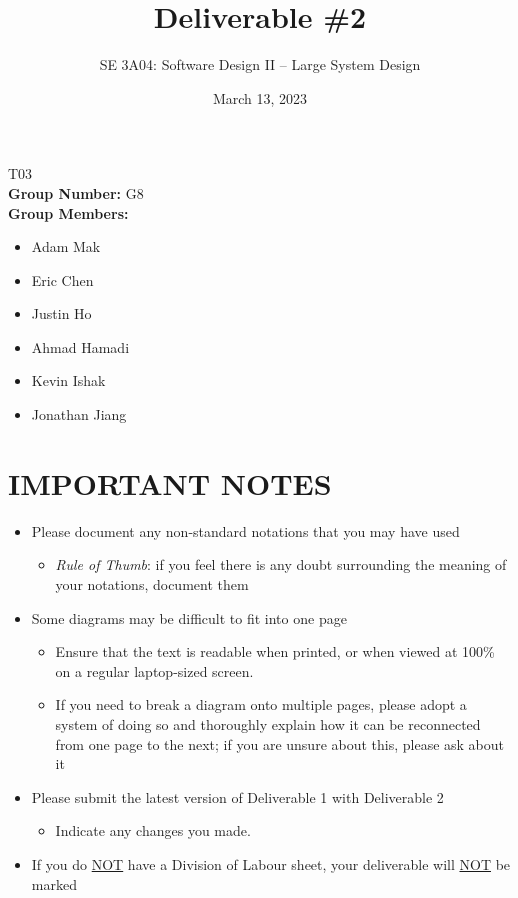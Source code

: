 \documentclass[]{article}
\title{Deliverable \#2}
\author{SE 3A04: Software Design II -- Large System Design}
\date{March 13, 2023}
\begin{document}
\maketitle\begin{center}
 T03\\
{\bf Group Number:} G8 \\
{\bf Group Members:} 
\begin{itemize} \centering
	\item Adam Mak
	\item Eric Chen
	\item Justin Ho
	\item Ahmad Hamadi
	\item Kevin Ishak
	\item Jonathan Jiang
\end{itemize}\end{center}

\section*{IMPORTANT NOTES}
\begin{itemize}
	\item Please document any non-standard notations that you may have used
	\begin{itemize}
		\item \emph{Rule of Thumb}: if you feel there is any doubt surrounding the meaning of your notations, document them
	\end{itemize}
	\item Some diagrams may be difficult to fit into one page
	\begin{itemize}
		\item Ensure that the text is readable when printed, or when viewed at 100\% on a regular laptop-sized screen.
		\item If you need to break a diagram onto multiple pages, please adopt a system of doing so and thoroughly explain how it can be reconnected from one page to the next; if you are unsure about this, please ask about it
	\end{itemize}
	\item Please submit the latest version of Deliverable 1 with Deliverable 2
	\begin{itemize}
		\item Indicate any changes you made.
	\end{itemize}
	\item If you do \underline{NOT} have a Division of Labour sheet, your deliverable will \underline{NOT} be marked
\end{itemize}
\end{document}
